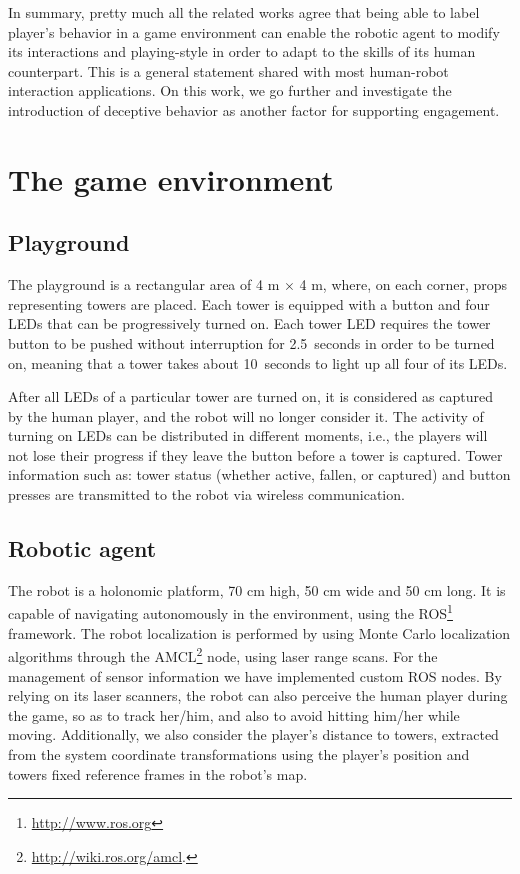 In summary, pretty much all the related works agree that being able to label player's behavior in a game environment can enable the robotic agent to modify its interactions and playing-style in order to adapt to the skills of its human counterpart. This is a general statement shared with most human-robot interaction applications. On this work, we go further and investigate the introduction of deceptive behavior as another factor for supporting engagement.

\section{The game environment}
\label{S:Thegameenvironment}
\subsection{Playground}
The playground is a rectangular area of 4 m $\times$ 4 m, where, on each corner, props representing towers are placed. Each tower is equipped with a button and four LEDs that can be progressively turned on. Each tower LED requires the tower button to be pushed without interruption for 2.5~seconds in order to be turned on, meaning that a tower takes about 10~seconds to light up all four of its LEDs. %

After all LEDs of a particular tower are turned on, it is considered as captured by the human player, and the robot will no longer consider it. The activity of turning on LEDs can be distributed in different moments, i.e., the players will not lose their progress if they leave the button before a tower is captured. Tower information such as: tower status (whether active, fallen, or captured) and button presses are transmitted to the robot via wireless communication.

\subsection{Robotic agent}
The robot is a holonomic platform, 70 cm high, 50 cm wide and 50 cm long.
It is capable of navigating autonomously in the environment, using the ROS\footnote{\url{http://www.ros.org}} framework. The robot localization is performed by using Monte Carlo localization algorithms through the AMCL\footnote{\url{http://wiki.ros.org/amcl}.} node, using laser range scans. For the management of sensor information we have implemented custom ROS nodes. By relying on its laser scanners, the robot can also perceive the human player during the game, so as to track her/him, and also to avoid hitting him/her while moving.
Additionally, we also consider the player's distance to towers, extracted from the system  coordinate transformations using the player's position and towers fixed reference frames in the robot's map. 


